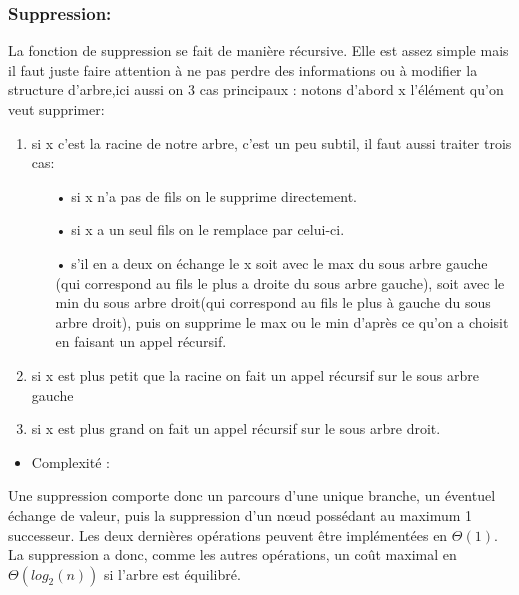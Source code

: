 \documentclass{report}
\begin{document}
\subsubsection{Suppression:} 
La fonction de suppression se fait de manière récursive. Elle est assez simple mais il faut juste faire attention à ne pas perdre des informations ou à modifier la structure d'arbre,ici aussi on 3 cas principaux :
notons d'abord x l'élément qu'on veut supprimer: 
\begin{enumerate}
\item si x c'est la racine de notre arbre, c'est un peu subtil, il faut aussi traiter trois cas:
\begin{itemize}
    \item[•] si x n'a pas de fils on le supprime directement.
    \item[•] si x a un seul fils on le remplace par celui-ci.
    \item[•] s'il en a deux on échange le x soit avec le max du sous arbre gauche (qui correspond au fils le plus a droite du sous arbre gauche), soit avec le min du sous arbre droit(qui correspond au fils le plus à gauche du sous arbre droit), puis on supprime le max ou le min d'après ce qu'on a choisit en faisant un appel récursif.
\end{itemize}
\item si x est plus petit que la racine on fait un appel récursif sur le sous arbre gauche 
\item si x est plus grand on fait un appel récursif sur le sous arbre droit.
\end{enumerate}
\begin{itemize}
    \item Complexité :
\end{itemize} 
Une suppression comporte donc un parcours d’une
unique branche, un éventuel échange de valeur, puis
la suppression d’un nœud possédant au maximum 1 successeur.
Les deux dernières opérations peuvent être
implémentées en $\Theta(1)$.
La suppression a donc, comme les autres opérations,
un coût maximal en $\Theta(log_2(n))$ si l’arbre est équilibré.
\end{document}
